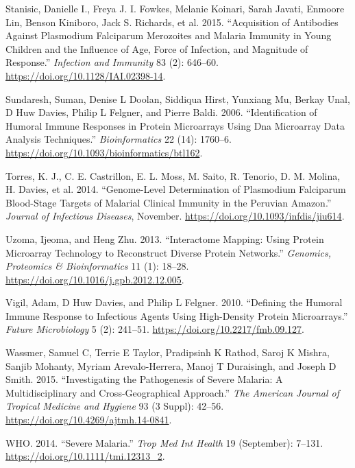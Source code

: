 \documentclass[
  a4paper]{article}
\begin{document}
\leavevmode\hypertarget{ref-Stanisic2015}{}%
Stanisic, Danielle I., Freya J. I. Fowkes, Melanie Koinari, Sarah
Javati, Enmoore Lin, Benson Kiniboro, Jack S. Richards, et al. 2015.
``Acquisition of Antibodies Against Plasmodium Falciparum Merozoites and
Malaria Immunity in Young Children and the Influence of Age, Force of
Infection, and Magnitude of Response.'' \emph{Infection and Immunity} 83
(2): 646--60. \url{https://doi.org/10.1128/IAI.02398-14}.

\leavevmode\hypertarget{ref-sundaresh2006}{}%
Sundaresh, Suman, Denise L Doolan, Siddiqua Hirst, Yunxiang Mu, Berkay
Unal, D Huw Davies, Philip L Felgner, and Pierre Baldi. 2006.
``Identification of Humoral Immune Responses in Protein Microarrays
Using Dna Microarray Data Analysis Techniques.'' \emph{Bioinformatics}
22 (14): 1760--6. \url{https://doi.org/10.1093/bioinformatics/btl162}.

\leavevmode\hypertarget{ref-Torres2014asymptomatic}{}%
Torres, K. J., C. E. Castrillon, E. L. Moss, M. Saito, R. Tenorio, D. M.
Molina, H. Davies, et al. 2014. ``Genome-Level Determination of
Plasmodium Falciparum Blood-Stage Targets of Malarial Clinical Immunity
in the Peruvian Amazon.'' \emph{Journal of Infectious Diseases},
November. \url{https://doi.org/10.1093/infdis/jiu614}.

\leavevmode\hypertarget{ref-uzoma2013interactome}{}%
Uzoma, Ijeoma, and Heng Zhu. 2013. ``Interactome Mapping: Using Protein
Microarray Technology to Reconstruct Diverse Protein Networks.''
\emph{Genomics, Proteomics \& Bioinformatics} 11 (1): 18--28.
\url{https://doi.org/10.1016/j.gpb.2012.12.005}.

\leavevmode\hypertarget{ref-vigil2010}{}%
Vigil, Adam, D Huw Davies, and Philip L Felgner. 2010. ``Defining the
Humoral Immune Response to Infectious Agents Using High-Density Protein
Microarrays.'' \emph{Future Microbiology} 5 (2): 241--51.
\url{https://doi.org/10.2217/fmb.09.127}.

\leavevmode\hypertarget{ref-wassmer2015}{}%
Wassmer, Samuel C, Terrie E Taylor, Pradipsinh K Rathod, Saroj K Mishra,
Sanjib Mohanty, Myriam Arevalo-Herrera, Manoj T Duraisingh, and Joseph D
Smith. 2015. ``Investigating the Pathogenesis of Severe Malaria: A
Multidisciplinary and Cross-Geographical Approach.'' \emph{The American
Journal of Tropical Medicine and Hygiene} 93 (3 Suppl): 42--56.
\url{https://doi.org/10.4269/ajtmh.14-0841}.

\leavevmode\hypertarget{ref-WHO2014severe}{}%
WHO. 2014. ``Severe Malaria.'' \emph{Trop Med Int Health} 19
(September): 7--131. \url{https://doi.org/10.1111/tmi.12313_2}.
\end{document}
